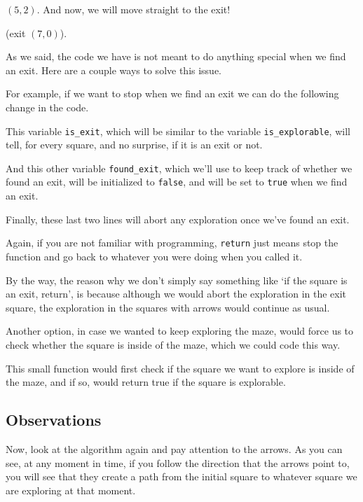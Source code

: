 \documentclass[12pt]{article}
\renewcommand{\v}[1]{\texttt{#1}}
\begin{document}
$(5, 2)$. And now, we will move straight to the exit!

(exit $(7, 0)$). 

As we said, the code we have is not meant to do anything special
when we find an exit. Here are a couple ways to solve this issue.

For example, if we want to stop when we find an exit
we can do the following change in the code.

This variable \verb|is_exit|, which will be similar to the
variable \verb|is_explorable|, will tell, for every square,
and no surprise, if it is an exit or not. 

And this other variable \verb|found_exit|, which we'll use
to keep track of whether we found an exit, will be initialized
to \v{false}, and will be set to \v{true} when we find an exit.

Finally, these last two lines will abort any exploration once
we've found an exit.

Again, if you are not familiar with programming,
\v{return} just means stop the function and go back to whatever
you were doing when you called it.

By the way, the reason why we don't simply say something like
`if the square is an exit, return', is because although we would
abort the exploration in the exit square, the exploration
in the squares with arrows would continue as usual.

Another option, in case we wanted to keep exploring the maze,
would force us to check whether the square
is inside of the maze, which we could code this way.

This small function would first check if the square we want to explore is
inside of the maze, and if so, would return true if the square is explorable.


\subsection{Observations}

Now, look at the algorithm again and pay attention to the arrows. As you can
see, at any moment in time, if you follow the direction that the arrows point to,
you will see that they create a path from the initial square to whatever square
we are exploring at that moment.
\end{document}
